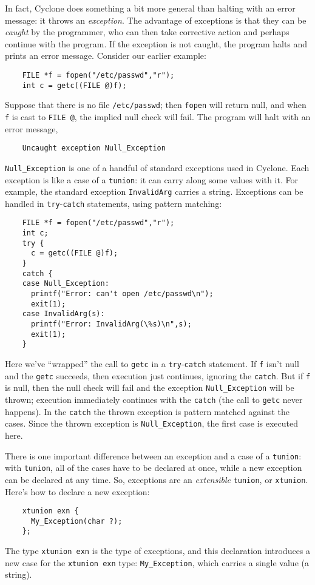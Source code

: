 In fact, Cyclone does something a bit more general than halting with
an error message: it throws an \emph{exception}.  The advantage of
exceptions is that they can be \emph{caught} by the programmer, who
can then take corrective action and perhaps continue with the program.
If the exception is not caught, the program halts and prints an error
message.  Consider our earlier example:
\begin{verbatim}
    FILE *f = fopen("/etc/passwd","r");
    int c = getc((FILE @)f);
\end{verbatim}
Suppose that there is no file \texttt{/etc/passwd}; then
\texttt{fopen} will return null, and when \texttt{f} is cast to
\texttt{FILE @}, the implied null check will fail.  The program will
halt with an error message,
\begin{verbatim}
    Uncaught exception Null_Exception
\end{verbatim}
\texttt{Null_Exception} is one of a handful of standard exceptions
used in Cyclone.  Each exception is like a case of a \texttt{tunion}:
it can carry along some values with it.  For example, the standard
exception \texttt{InvalidArg} carries a string.  Exceptions can be
handled in \texttt{try}-\texttt{catch} statements, using pattern
matching:
\begin{verbatim}
    FILE *f = fopen("/etc/passwd","r");
    int c;
    try {
      c = getc((FILE @)f);
    }
    catch {
    case Null_Exception:
      printf("Error: can't open /etc/passwd\n");
      exit(1);
    case InvalidArg(s):
      printf("Error: InvalidArg(\%s)\n",s);
      exit(1);
    }
\end{verbatim}
Here we've ``wrapped'' the call to \texttt{getc} in a
\texttt{try}-\texttt{catch} statement.  If \texttt{f} isn't null and
the \texttt{getc} succeeds, then execution just continues, ignoring
the \texttt{catch}.  But if \texttt{f} is null, then the null check
will fail and the exception \texttt{Null_Exception} will be thrown;
execution immediately continues with the \texttt{catch} (the call to
\texttt{getc} never happens).  In the \texttt{catch} the thrown
exception is pattern matched against the cases.  Since the thrown
exception is \texttt{Null_Exception}, the first case is executed here.

There is one important difference between an exception and a case of a
\texttt{tunion}: with \texttt{tunion}, all of the cases have to be
declared at once, while a new exception can be declared at any time.
So, exceptions are an \emph{extensible} \texttt{tunion}, or
\texttt{xtunion}.  Here's how to declare a new exception:
\begin{verbatim}
    xtunion exn {
      My_Exception(char ?);
    };
\end{verbatim}
The type \texttt{xtunion exn} is the type of exceptions, and this
declaration introduces a new case for the \texttt{xtunion exn} type:
\texttt{My_Exception}, which carries a single value (a string).

